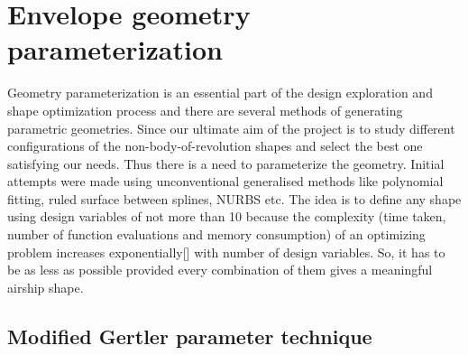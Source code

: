 \chapter{Envelope geometry parameterization}
\label{geometry}

Geometry parameterization is an essential part of the design exploration and shape optimization process and there are several methods of generating parametric geometries. Since our ultimate aim of the project is to study different configurations of the non-body-of-revolution shapes and select the best one satisfying our needs. Thus there is a need to parameterize the geometry. Initial attempts were made using unconventional generalised methods like polynomial fitting, ruled surface between splines, NURBS etc. The idea is to define any shape using design variables of not more than 10 because the complexity (time taken, number of function evaluations and memory consumption) of an optimizing problem increases exponentially[] with number of design variables. So, it has to be as less as possible provided every combination of them gives a meaningful airship shape.

\section{Modified Gertler parameter technique}

